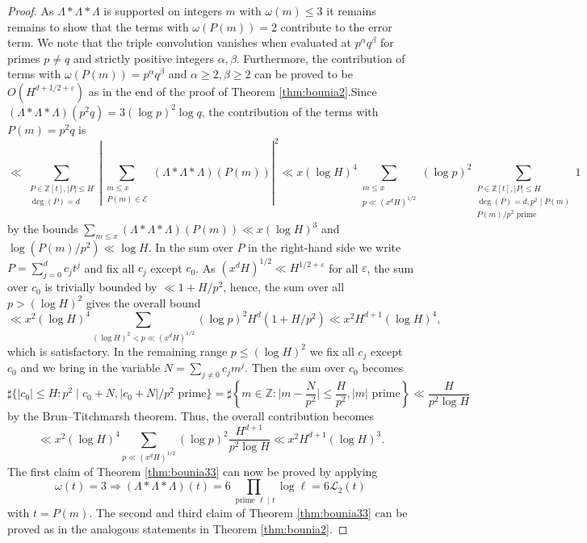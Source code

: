 \documentclass[reqno, 11pt]{amsart}
\numberwithin{equation}{section}
\theoremstyle{definition}
\newcommand{\0}{\mathbf{0}}
\renewcommand{\leq}{\leqslant}
\renewcommand{\geq}{\geqslant}
\renewcommand{\P}{\mathbb{P}}
\renewcommand{\c}{\mathcal}
\renewcommand{\epsilon}{\varepsilon}
\renewcommand{\leq}{\leqslant}
\renewcommand{\geq}{\geqslant}
\renewcommand{\#}{\sharp}
\begin{document}
\begin{proof}
As $\Lambda \ast\Lambda \ast \Lambda$ is supported on integers $m$ with $\omega(m)\leq 3$ it remains
  remains to show that the terms with $\omega(P(m))=2$ contribute to the error term. We note that the triple 
  convolution  vanishes
when evaluated 
at $p^\alpha q^\beta$ for primes $p\neq q $
and strictly positive integers $\alpha,\beta$.
Furthermore, the contribution of
terms with $\omega(P(m))=p^\alpha q^\beta$ and $\alpha
\geq 2,\beta\geq 2 $  
can be proved to be  $O(H^{d+1/2+\epsilon})$
as in the end of the proof of Theorem 
\ref{thm:bounia2}.Since
$(\Lambda \ast \Lambda \ast \Lambda)(p^2 q) =3
(\log p)^2\log q $, 
the contribution of the terms with $P(m)=p^2 q $ 
is 
$$\ll 
\sum_{\substack{ P\in \mathbb Z[t],|P|\leq H \\  \deg(P)=d}} 
\left|
\sum_{\substack{m\leq x\\P(m)\in \c E} } 
(\Lambda \ast \Lambda \ast \Lambda)(P(m))
\right|^2  \ll  x (\log H)^4
\sum_{\substack{ m \leq x \\ 
p \ll (x^dH)^{1/2}
}} (\log p)^2
\sum_{\substack{ P\in \mathbb Z[t],|P|\leq H \\  
\deg(P)=d,p^2 \mid  P(m)\\
P(m)/p^2 \textrm{ prime}} } 1 $$
by the bounds $
\sum_{m\leq x} 
(\Lambda \ast \Lambda \ast \Lambda)(P(m)) \ll x (\log H)^3$
and $\log (P(m)/p^2) \ll \log H$.
In the sum over $P$ in the right-hand side we 
write  $P=\sum_{j=0}^d c_j t^j $ and fix 
all $c_j$ except $c_0$.
As $(x^d H)^{1/2}\ll H^{1/2+\epsilon}$ for all $\epsilon$,
the sum over $c_0$ is trivially bounded by $\ll 1+ H/p^2$, 
hence, the sum over all $p> (\log H)^2$ gives the overall bound
$$  \ll  x^2 (\log H)^4
\sum_{(\log H)^2 < p \ll (x^dH)^{1/2} }(\log p)^2
H^d (1+ H/p^2)\ll 
x^2 H^{d+1}(\log H)^4
,$$ which is satisfactory. In the remaining range $p\leq (\log H)^2$
we fix   all $c_j$ except $c_0$ and we bring in  
the variable   $N=\sum_{j\neq 0} c_j m^j$. Then 
 the sum over $c_0$ becomes
 $$\#\{|c_0| \leq H :p^2 \mid c_0+N, |c_0+N|/p^2 \textrm{ prime}\}
 = \#\left\{m\in \mathbb Z: \Big|m- \frac{N}{p^2}\Big| \leq \frac{H}{p^2}, |m| \textrm{ prime}\right\} \ll \frac{H}{p^2 \log H}
 $$ by the Brun--Titchmarsh theorem.
 Thus, the overall contribution becomes 
$$ \ll x^2 (\log H)^4
\sum_{
p \ll (x^dH)^{1/2}  
 } (\log p)^2 \frac{H^{d+1} }{p^2 \log H}
\ll x^2 H^{d+1} (\log H)^3.$$
The first claim of 
Theorem \ref{thm:bounia33}
can now be proved by applying  
\[  \omega(t)=3 \Rightarrow 
(\Lambda\ast \Lambda\ast  \Lambda)(t)=6 \prod_{ \textrm{ prime } 
\ell  \mid t} \log \ell =6 \c L_2(t)
\]with $t=P(m)$. The second and third claim of
Theorem \ref{thm:bounia33}
can be proved as in the analogous statements in 
Theorem \ref{thm:bounia2}.
\end{proof}
 
\end{document}
